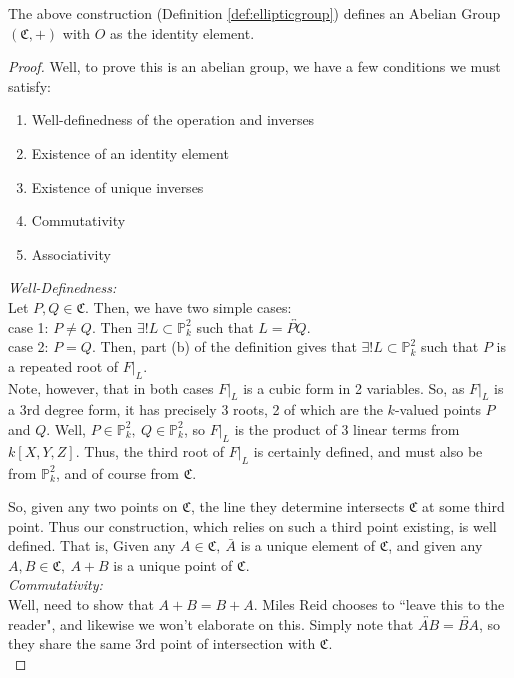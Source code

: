 \begin{theorem}
The above construction (Definition \ref{def:ellipticgroup}) defines
an Abelian Group $(\mathfrak{C},+)$ with $O$ as the identity element.
\end{theorem}

\begin{proof}
Well, to prove this is an abelian group, we have a few conditions we must satisfy:
\begin{enumerate}
\item Well-definedness of the operation and inverses
\item Existence of an identity element
\item Existence of unique inverses
\item Commutativity
\item Associativity
\end{enumerate}

\emph{Well-Definedness:}\\
Let $P, Q \in \mathfrak{C}$. Then, we have two simple cases:\\

case 1:  $P \ne Q$. Then $\exists! L \subset \mathbb{P}^2_k$ such that $L = \overleftrightarrow{PQ}$.\\

case 2: $P = Q$. Then, part (b) of the definition gives that $\exists! L \subset \mathbb{P}^2_k$ such that
$P$ is a repeated root of $F|_L$.\\

Note, however, that in both cases $F|_L$ is a cubic form in 2 variables.
So, as $F|_L$ is a 3rd degree form, it has precisely 3 roots, 2 of which
are the $k$-valued points $P$ and $Q$. Well, $P \in \mathbb{P}^2_k,~Q\in \mathbb{P}^2_k$,
so $F|_L$ is the product of 3 linear terms from $k[X,Y,Z]$. Thus, the
third root of $F|_L$ is certainly defined, and must also be from $\mathbb{P}^2_k$, and of course from $\mathfrak{C}$.

So, given any two points on $\mathfrak{C}$, the line they determine intersects $\mathfrak{C}$ at some third point.
Thus our construction, which relies on such a third point existing, is well defined. That is,
Given any $A \in \mathfrak{C},~\bar{A}$ is a unique element of $\mathfrak{C}$, and given any $A, B \in \mathfrak{C},~A+B$ 
is a unique point of $\mathfrak{C}$.\\

\emph{Commutativity:}\\
Well, need to show that $A+B = B+A$. Miles Reid chooses to ``leave this to the reader", 
and likewise we won't elaborate on this. Simply note that $\overleftrightarrow{AB} = \overleftrightarrow{BA}$,
so they share the same 3rd point of intersection with $\mathfrak{C}$.\\


\end{proof}

